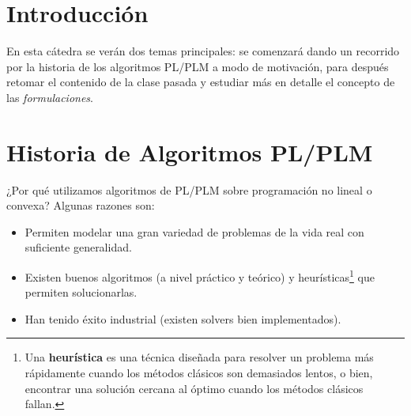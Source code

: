 
\newcommand{\sca}{Matías Azócar}
\newcommand{\scb}{Carolina Chiu}
\newcommand{\scc}{Francisco Muñoz}
\newcommand{\catnum}{2} %
\newcommand{\fecha}{\today}




% 


\section*{Introducción}

En esta cátedra se verán dos temas principales: se comenzará dando un recorrido por la historia de los algoritmos PL/PLM a modo de motivación, para después retomar el contenido de la clase pasada y estudiar más en detalle el concepto de las \textit{formulaciones}.

\section{Historia de Algoritmos PL/PLM}
¿Por qué utilizamos algoritmos de PL/PLM sobre programación no lineal o convexa? Algunas razones son:
\begin{itemize}
    \item Permiten modelar una gran variedad de problemas de la vida real con suficiente generalidad.
    \item Existen buenos algoritmos (a nivel práctico y teórico) y heurísticas\footnote{Una \textbf{heurística} es una técnica diseñada para resolver un problema más rápidamente cuando los métodos clásicos son demasiados lentos, o bien, encontrar una solución cercana al óptimo cuando los métodos clásicos fallan.} que permiten solucionarlas.
    \item Han tenido éxito industrial (existen solvers bien implementados).
\end{itemize}

